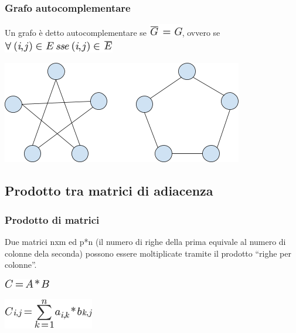 \documentclass{article}
\begin{document}
{}

\hypertarget{h.tsrwv4qy0dku}{\subsubsection{\texorpdfstring{{Grafo
autocomplementare}}{Grafo autocomplementare}}\label{h.tsrwv4qy0dku}}

{Un grafo è detto autocomplementare se
}\includegraphics{images/image404.png}{, ovvero se
}\includegraphics{images/image405.png}

{\includegraphics{images/image532.png}}

{}

\hypertarget{h.akx1r9fzvwzo}{\subsection{\texorpdfstring{{Prodotto tra
matrici di
adiacenza}}{Prodotto tra matrici di adiacenza}}\label{h.akx1r9fzvwzo}}

{}

\hypertarget{h.c39ti8il3qtf}{\subsubsection{\texorpdfstring{{Prodotto di
matrici}}{Prodotto di matrici}}\label{h.c39ti8il3qtf}}

{Due matrici nxm ed p*n (il numero di righe della prima equivale al
numero di colonne dela seconda) possono essere moltiplicate tramite il
prodotto ``righe per colonne''.}

\includegraphics{images/image406.png}

\includegraphics{images/image407.png}
\end{document}
